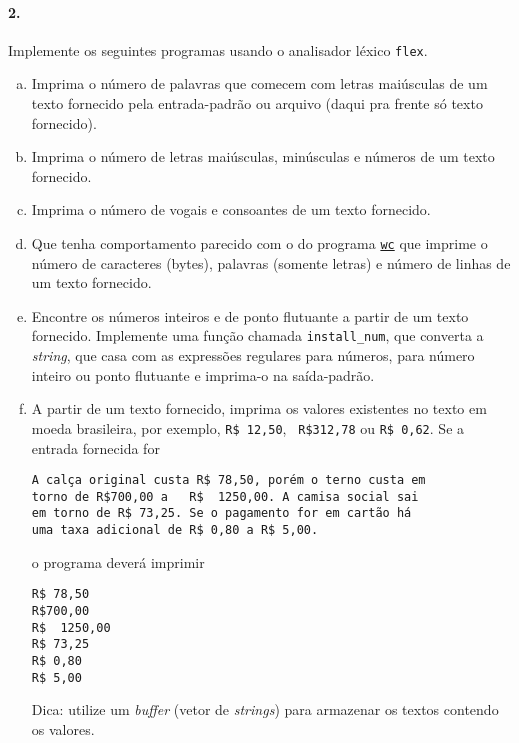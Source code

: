 \paragraph{2.} Implemente os seguintes programas usando o analisador léxico {\tt flex}.

\begin{enumerate}[a)]
\item Imprima o número de palavras que comecem com letras maiúsculas
  de um texto fornecido pela entrada-padrão ou arquivo (daqui pra
  frente só texto fornecido).

\item Imprima o número de letras maiúsculas, minúsculas e números de
  um texto fornecido.

\item Imprima o número de vogais e consoantes de um texto fornecido.

\item Que tenha comportamento parecido com o do programa
  \href{https://pt.wikipedia.org/wiki/Wc}{\tt wc} que imprime o número
        de caracteres (bytes), palavras (somente letras) 
        e número de linhas de um texto fornecido.

\item Encontre os números inteiros e de ponto flutuante a partir de um 
texto fornecido. Implemente uma função chamada {\tt install\_num}, 
que converta a {\it string\/}, que casa com as expressões regulares para números, 
para número inteiro ou ponto flutuante e imprima-o na saída-padrão.

\item A partir de um texto fornecido, imprima os valores existentes no
  texto em moeda brasileira, por exemplo, {\tt R\$ 12,50}, {\tt
    R\$312,78} ou {\tt R\$ 0,62}.  Se a entrada fornecida for

\begin{verbatim}
A calça original custa R$ 78,50, porém o terno custa em
torno de R$700,00 a   R$  1250,00. A camisa social sai
em torno de R$ 73,25. Se o pagamento for em cartão há
uma taxa adicional de R$ 0,80 a R$ 5,00.
\end{verbatim}

o programa deverá imprimir

\begin{verbatim}
R$ 78,50
R$700,00
R$  1250,00
R$ 73,25
R$ 0,80
R$ 5,00
\end{verbatim}

Dica: utilize um {\it buffer\/} (vetor de {\it strings\/}) para
armazenar os textos contendo os valores.


\end{enumerate}
